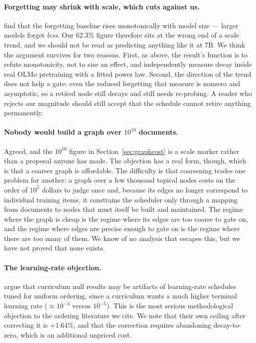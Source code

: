 \documentclass[11pt]{article}
\theoremstyle{plain}
\theoremstyle{definition}
\theoremstyle{remark}
\begin{document}
\paragraph{Forgetting may shrink with scale, which cuts against us.}
\citet{tirumala2022memorization} find that the forgetting baseline rises
monotonically with model size --- larger models forget \emph{less}. Our $62.3\%$
figure therefore sits at the wrong end of a scale trend, and we should not be
read as predicting anything like it at 7B. We think the argument survives for two
reasons. First, as above, the result's function is to refute monotonicity, not to
size an effect, and \citet{chang2024acquire} independently measure decay inside
real OLMo pretraining with a fitted power law. Second, the direction of the trend
does not help a gate: even the reduced forgetting that
\citet{tirumala2022memorization} measure is nonzero and asymptotic, so a retired
node still decays and still needs re-probing. A reader who rejects our magnitude
should still accept that the schedule cannot retire anything permanently.

\paragraph{Nobody would build a graph over $10^{10}$ documents.} Agreed, and the
$10^{16}$ figure in Section~\ref{sec:graphcost} is a scale marker rather than a
proposal anyone has made. The objection has a real form, though, which is that a
coarser graph is affordable. The difficulty is that coarsening trades one problem
for another: a graph over a few thousand topical nodes costs on the order of
$10^5$ dollars to judge once and, because its edges no longer correspond to
individual training items, it constrains the scheduler only through a mapping
from documents to nodes that must itself be built and maintained. The regime
where the graph is cheap is the regime where its edges are too coarse to gate on,
and the regime where edges are precise enough to gate on is the regime where
there are too many of them. We know of no analysis that escapes this, but we have
not proved that none exists.

\paragraph{The learning-rate objection.} \citet{luo2025lrdecay} argue that
curriculum null results may be artifacts of learning-rate schedules tuned for
uniform ordering, since a curriculum wants a much higher terminal learning rate
($\approx 10^{-3}$ versus $10^{-5}$). This is the most serious methodological
objection to the ordering literature we cite. We note that their own ceiling
after correcting it is $+1.64\%$, and that the correction requires abandoning
decay-to-zero, which is an additional unpriced cost.
\end{document}
